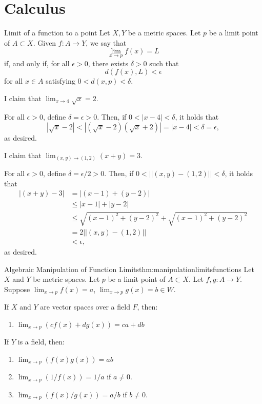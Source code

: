 \chapter{Calculus}

\begin{defn}{Limit of a function to a point}{}
	Let \(X, Y\) be a metric spaces.
	Let \(p\) be a limit point of \(A \subset X\).
	Given \(f \colon A \to Y\), we say that \[\lim_{x\to p} f(x) = L\] if, and only if, for all  \(\epsilon > 0\), there exists \(\delta > 0\) such that \[d(f(x), L) < \epsilon\] for all \(x \in A\) satisfying \(0 < d(x, p) < \delta\).
\end{defn}

\begin{exmp}{}{}
	I claim that \(\lim_{x\to 4} \sqrt{x} = 2\).

	For all \(\epsilon > 0\), define \(\delta = \epsilon > 0\). Then, if \(0 < |x - 4| < \delta\), it holds that \[
		|\sqrt{x} - 2| < |(\sqrt{x} - 2)(\sqrt{x} + 2)| = |x - 4| < \delta = \epsilon,
	\]
	as desired.
\end{exmp}

\begin{exmp}{}{}
	I claim that \(\lim_{(x, y) \to (1,2)} (x+y) = 3\).

	For all \(\epsilon > 0\), define \(\delta = \epsilon/2 > 0\). Then, if \(0 < ||(x, y) - (1, 2)|| < \delta\),
	it holds that
	\begin{align*}
		|(x+y) - 3| &= |(x - 1) + (y - 2)| \\
					&\leq |x-1| + |y-2| \\
					&\leq \sqrt{(x-1)^2 + (y-2)^2} + \sqrt{(x-1)^2 + (y-2)^2}  \\
					&= 2 ||(x, y) - (1, 2)|| \\
					&< \epsilon,
	\end{align*}
	as desired.
\end{exmp}

\begin{thm}{Algebraic Manipulation of Function Limits}{thm:manipulationlimitsfunctions}
	Let \(X\) and \(Y\) be metric spaces.  Let \(p\) be a limit point of \(A \subset X\). Let \(f, g\colon A \to Y\).
	Suppose \(\lim_{x \to p}f(x) = a\),  \(\lim_{x \to p}g(x) = b \in W\).

	If \(X\) and \(Y\) are vector spaces over a field \(F\), then:
	\begin{enumerate}
		\item \(\lim_{x \to p}(cf(x) + dg(x)) = ca + db\)
	\end{enumerate}

	If \(Y\) is a field, then:
	\begin{enumerate}[resume]
		\item \(\lim_{x\to p}(f(x)g(x)) = ab\)
		\item \(\lim_{x\to p}(1/f(x)) = 1/a\) if \(a \neq 0\).  
		\item \(\lim_{x\to p}(f(x)/g(x)) = a/b\) if \(b \neq 0\).  
	\end{enumerate}
\end{thm}


